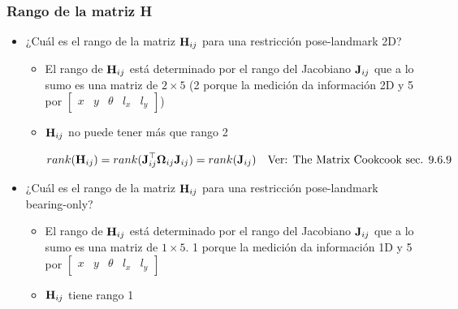 \begin{frame}
    \frametitle{Rango de la matriz H}
    
    \begin{itemize}
        \item ¿Cuál es el rango de la matriz $\boldsymbol{\mathbf{H}}_{ij}$ para una restricción pose-landmark 2D?
        \begin{itemize}
            \item El rango de $\boldsymbol{\mathbf{H}}_{ij}$ está determinado por el rango del Jacobiano $\boldsymbol{\mathbf{J}}_{ij}$ que a lo sumo es una matriz de $2 \times 5$ (2 porque la medición da información 2D y 5 por $\begin{bmatrix}    x & y & \theta & l_{x} & l_{y} \end{bmatrix}$)
            \item $\boldsymbol{\mathbf{H}}_{ij}$ no puede tener más que rango 2
            
                $rank(\boldsymbol{\mathbf{H}}_{ij}) = rank(\boldsymbol{\mathbf{J}}_{ij}^{\top} \boldsymbol{\mathbf{\Omega}}_{ij} \boldsymbol{\mathbf{J}}_{ij}) = rank(\boldsymbol{\mathbf{J}}_{ij}) \quad \text{Ver: The Matrix Cookcook sec. 9.6.9}$ 
        \end{itemize}
    
        \item ¿Cuál es el rango de la matriz $\boldsymbol{\mathbf{H}}_{ij}$ para una restricción pose-landmark bearing-only?
        \begin{itemize}
            \item El rango de $\boldsymbol{\mathbf{H}}_{ij}$ está determinado por el rango del Jacobiano $\boldsymbol{\mathbf{J}}_{ij}$ que a lo sumo es una matriz de $1 \times 5$. 1 porque la medición da información 1D y 5 por $\begin{bmatrix}    x & y & \theta & l_{x} & l_{y} \end{bmatrix}$
            \item $\boldsymbol{\mathbf{H}}_{ij}$ tiene rango 1
        \end{itemize}
        
    \end{itemize}
\end{frame}

